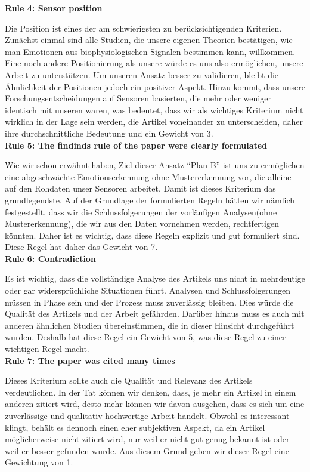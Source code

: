 \textbf{Rule 4: Sensor position}

Die Position ist eines der am schwierigsten zu berücksichtigenden Kriterien. Zunächst einmal sind alle Studien, die unsere eigenen Theorien bestätigen, wie man Emotionen aus biophysiologischen Signalen bestimmen kann, willkommen. 
Eine noch andere Positionierung als unsere würde es uns also ermöglichen, unsere Arbeit zu unterstützen. 
Um unseren Ansatz besser zu validieren, bleibt die Ähnlichkeit der Positionen jedoch ein positiver Aspekt. 
Hinzu kommt, dass unsere Forschungsentscheidungen auf Sensoren basierten, die mehr oder weniger identisch mit unseren waren, was bedeutet, dass wir als wichtiges Kriterium nicht wirklich in der Lage sein werden, die Artikel voneinander zu unterscheiden, daher ihre durchschnittliche Bedeutung und ein Gewicht von 3. \\


\textbf{Rule 5: The findinds rule of the paper were clearly formulated}

Wie wir schon erwähnt haben, Ziel dieser Ansatz  ``Plan B'' ist uns zu ermöglichen eine abgeschwächte Emotionserkennung ohne Mustererkennung vor, die alleine auf den Rohdaten unser Sensoren arbeitet. 
Damit ist dieses Kriterium das grundlegendste. Auf der Grundlage der formulierten Regeln hätten wir nämlich festgestellt, dass wir die Schlussfolgerungen der vorläufigen Analysen(ohne Mustererkennung), die wir aus den Daten vornehmen werden, rechtfertigen könnten. Daher ist es wichtig, dass diese Regeln explizit und gut formuliert sind. 
Diese Regel hat daher das Gewicht von 7. \\


\textbf{Rule 6: Contradiction}

Es ist wichtig, dass die vollständige Analyse des Artikels uns nicht in mehrdeutige oder gar widersprüchliche Situationen führt. 
Analysen und Schlussfolgerungen müssen in Phase sein und der Prozess muss zuverlässig bleiben. 
Dies würde die Qualität des Artikels und der Arbeit gefährden. 
Darüber hinaus muss es auch mit anderen ähnlichen Studien übereinstimmen, die in dieser Hinsicht durchgeführt wurden. 
Deshalb hat diese Regel ein Gewicht von 5, was diese Regel zu einer wichtigen Regel macht. \\


\textbf{Rule 7: The paper was cited many times}
  
Dieses Kriterium sollte auch die Qualität und Relevanz des Artikels verdeutlichen. 
In der Tat können wir denken, dass, je mehr ein Artikel in einem anderen zitiert wird, desto mehr können wir davon ausgehen, dass es sich um eine zuverlässige und qualitativ hochwertige Arbeit handelt. 
Obwohl es interessant klingt, behält es dennoch einen eher subjektiven Aspekt, da ein Artikel möglicherweise nicht zitiert wird, nur weil er nicht gut genug bekannt ist oder weil er besser gefunden wurde. 
Aus diesem Grund geben wir dieser Regel eine Gewichtung von 1. \\


